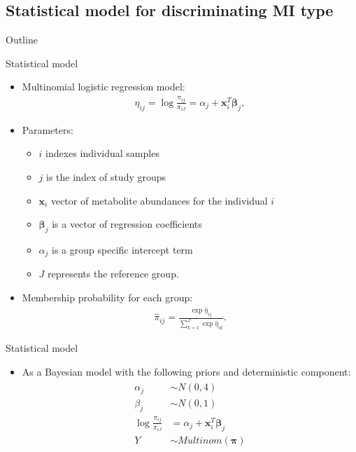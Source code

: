 \documentclass[xcolor=dvipsnames]{beamer}
\begin{document}
\subsection{Statistical model for discriminating MI type}
\begin{frame}{Outline}
	\vspace{-10.5pt}
	\tableofcontents[currentsection,subsectionstyle=show/shaded/hide]
\end{frame}

\begin{frame}{Statistical model}
	\vspace{-10.5pt}
	\begin{itemize}
		\item Multinomial logistic regression model:
			\begin{align*}
			\eta_{ij} = \log \frac{\pi_{ij}}{\pi_{iJ}} = \alpha_j + \textbf{x}_i^T \boldsymbol{\beta}_j,
			\end{align*} \pause
		\item Parameters:
		\begin{itemize}
			\item $i$ indexes individual samples
			\item $j$ is the index of study groups
			\item $\textbf{x}_i$ vector of metabolite abundances for the individual $i$
			\item $\boldsymbol{\beta}_j$ is a vector of regression coefficients 
			\item $\alpha_j$ is a group specific intercept term
			\item $J$ represents the reference group.
		\end{itemize} \pause
		\item Membership probability for each group:
		\begin{align*}
		\hat{\pi}_{ij} = \frac{\exp \hat{\eta}_{ij}}{\sum_{k=1}^{J}\exp \hat{\eta}_{ik}}.
		\end{align*}
	\end{itemize}
\end{frame}

\begin{frame}{Statistical model}
	\vspace{-10.5pt}
	\begin{itemize}
		\item As a Bayesian model with the following priors and deterministic component:
		\begin{align*}
		\begin{split}
		\alpha_j &\sim N(0,4) \\
		\beta_j &\sim N(0,1) \\
		\log \frac{\pi_{ij}}{\pi_{iJ}} &= \alpha_j + \textbf{x}_i^T \boldsymbol{\beta}_j \\
		Y &\sim Multinom(\boldsymbol{\pi})
		\end{split}
		\end{align*}
	\end{itemize}
\end{frame}
\end{document}
